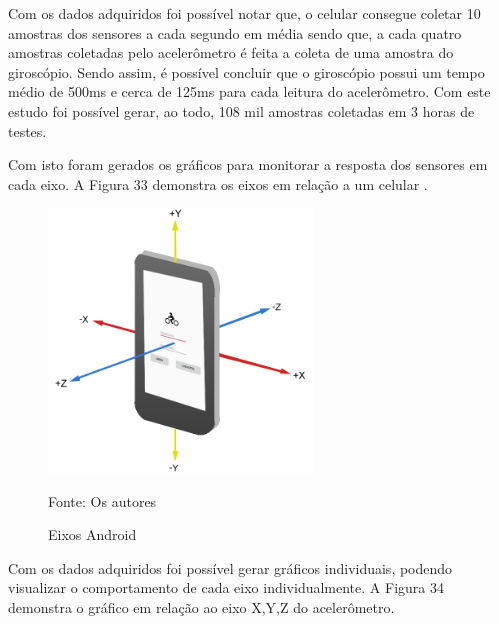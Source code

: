 Com os dados adquiridos foi  possível notar que, o celular consegue coletar 10 amostras dos sensores a cada segundo em média sendo que, a cada quatro amostras coletadas pelo acelerômetro é feita a coleta de uma amostra do giroscópio. Sendo assim, é possível concluir que o giroscópio possui um tempo médio de 500ms e cerca de 125ms para cada leitura do acelerômetro. Com este estudo foi possível gerar, ao todo, 108 mil amostras coletadas em 3 horas de testes.

Com isto foram gerados os gráficos para monitorar a resposta dos sensores em cada eixo. A Figura 33 demonstra os eixos em relação a um celular .

 \begin{figure}[H]

\begin{center}
     \caption{Eixos Android}
  \includegraphics[width=70mm]{images/Cap5/eixos_anjo.png}
\end{center}
 \scriptsize Fonte: Os autores
  
\end{figure}


Com os dados adquiridos foi possível gerar gráficos individuais,  podendo visualizar o comportamento de cada eixo individualmente. A Figura 34 demonstra o gráfico em relação ao eixo X,Y,Z do acelerômetro.


